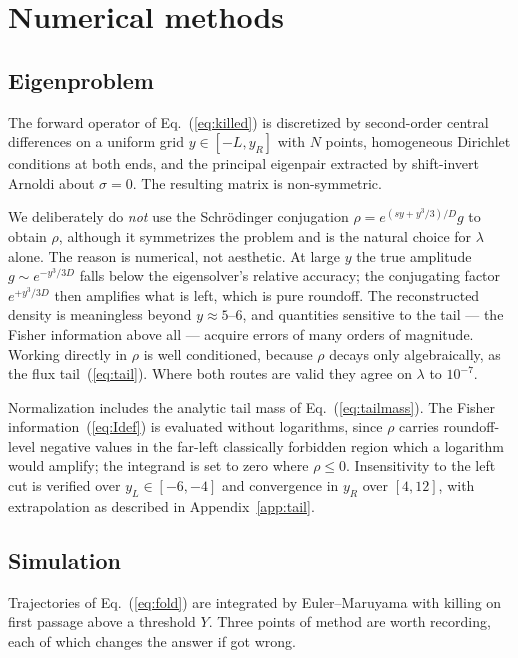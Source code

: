 \section{\label{app:num}Numerical methods}

\subsection{Eigenproblem}

The forward operator of Eq.~(\ref{eq:killed}) is discretized by second-order central differences on a uniform grid $y\in[-L,y_R]$ with $N$ points, homogeneous Dirichlet conditions at both ends, and the principal eigenpair extracted by shift-invert Arnoldi about $\sigma=0$.  The resulting matrix is non-symmetric.

We deliberately do \emph{not} use the Schr\"odinger conjugation $\rho=e^{(sy+y^3/3)/D}g$ to obtain $\rho$, although it symmetrizes the problem and is the natural choice for $\lambda$ alone.  The reason is numerical, not aesthetic.  At large $y$ the true amplitude $g\sim e^{-y^3/3D}$ falls below the eigensolver's relative accuracy; the conjugating factor $e^{+y^3/3D}$ then amplifies what is left, which is pure roundoff.  The reconstructed density is meaningless beyond $y\approx5$--$6$, and quantities sensitive to the tail --- the Fisher information above all --- acquire errors of many orders of magnitude.  Working directly in $\rho$ is well conditioned, because $\rho$ decays only algebraically, as the flux tail~(\ref{eq:tail}).  Where both routes are valid they agree on $\lambda$ to $10^{-7}$.

Normalization includes the analytic tail mass of Eq.~(\ref{eq:tailmass}).  The Fisher information~(\ref{eq:Idef}) is evaluated without logarithms, since $\rho$ carries roundoff-level negative values in the far-left classically forbidden region which a logarithm would amplify; the integrand is set to zero where $\rho\le0$.  Insensitivity to the left cut is verified over $y_L\in[-6,-4]$ and convergence in $y_R$ over $[4,12]$, with extrapolation as described in Appendix~\ref{app:tail}.

\subsection{Simulation}

Trajectories of Eq.~(\ref{eq:fold}) are integrated by Euler--Maruyama with killing on first passage above a threshold $Y$.  Three points of method are worth recording, each of which changes the answer if got wrong.

